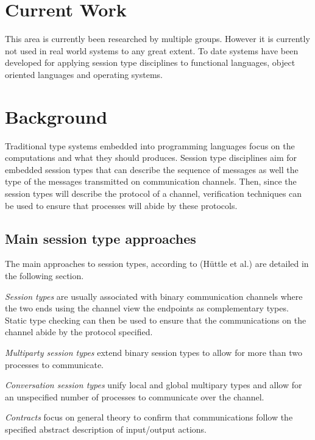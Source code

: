 \section{Current Work}
This area is currently been researched by multiple groups. However it is currently not used in real world systems to any great extent. To date systems have been developed for applying session type disciplines to functional languages, object oriented languages and operating systems. 

\section{Background}
Traditional type systems embedded into programming languages focus on the computations and what they should produces. Session type disciplines aim for embedded session types that can describe the sequence of messages as well the type of the messages transmitted on communication channels. Then, since the session types will describe the protocol of a channel, verification techniques can be used to ensure that processes will abide by these protocols. 

\subsection{Main session type approaches}
The main approaches to session types, according to (H\"{u}ttle et al.) \cite{foundBTypes} are detailed in the following section.

\textit{Session types} are usually associated with binary communication channels where the two ends using the channel view the endpoints as complementary types. Static type checking can then be used to ensure that the communications on the channel abide by the protocol specified. 

\textit{Multiparty session types} extend binary session types to allow for more than two processes to communicate. 

\textit{Conversation session types} unify local and global multipary types and allow for an unspecified number of processes to communicate over the channel. 

\textit{Contracts} focus on general theory to confirm that communications follow the specified abstract description of input/output actions.

